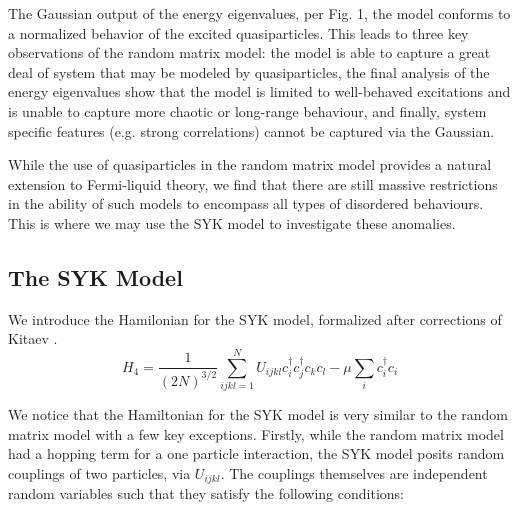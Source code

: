 \documentclass[reprint]{revtex4-2}
\begin{document}
The Gaussian output of the energy eigenvalues, per Fig. 1, the model conforms to a normalized behavior of the excited quasiparticles. This leads to three key observations of the random matrix model: the model is able to capture a great deal of system that may be modeled by quasiparticles, the final analysis of the energy eigenvalues show that the model is limited to well-behaved excitations and is unable to capture more chaotic or long-range behaviour, and finally, system specific features (e.g. strong correlations) cannot be captured via the Gaussian.
\par While the use of quasiparticles in the random matrix model provides a natural extension to Fermi-liquid theory, we find that there are still massive restrictions in the ability of such models to encompass all types of disordered behaviours. This is where we may use the SYK model to investigate these anomalies. 
\subsection{The SYK Model}
We introduce the Hamilonian for the SYK model, formalized after corrections of Kitaev \cite{Kitaev_2015}. 
\begin{equation}\label{eq:5}
    H_{4} = \frac{1}{(2N)^{3/2}} \sum_{ijkl =1}^{N} U_{ijkl} c_{i}^{\dagger}c_{j}^{\dagger}c_{k}c_{l} -  \mu \sum_{i}c_{i}^{\dagger}c_{i}
\end{equation}

We notice that the Hamiltonian for the SYK model is very similar to the random matrix model with a few key exceptions. Firstly, while the random matrix model had a hopping term for a one particle interaction, the SYK model posits random couplings of two particles, via $U_{ijkl}$. The couplings themselves are independent random variables such that they satisfy the following conditions:
\end{document}
